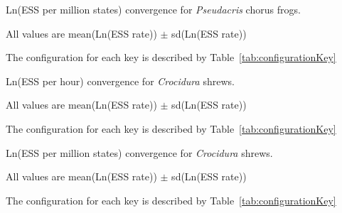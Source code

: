 \documentclass[12pt]{article}
\begin{document}
\begin{landscape}
\clearpage

\begin{table}[htb!]
\centering
\caption{Ln(ESS per million states) convergence for \textit{Pseudacris} chorus frogs.}
\label{tab:pseudacrisPerMstates}
\begin{threeparttable}
\begin{adjustbox}{center}
\renewcommand{\arraystretch}{1.5}
\tiny

\end{adjustbox}
\begin{tablenotes}
\tiny
\item All values are mean(Ln(ESS rate)) $\pm$ sd(Ln(ESS rate))
\item The configuration for each key is described by Table~\ref{tab:configurationKey}
\end{tablenotes}
\end{threeparttable}
\end{table}

\clearpage

\begin{table}[htb!]
\centering
\caption{Ln(ESS per hour) convergence for \textit{Crocidura} shrews.}
\label{tab:crociduraPerHour}
\begin{threeparttable}
\begin{adjustbox}{center}
\renewcommand{\arraystretch}{1.5}
\tiny

\end{adjustbox}
\begin{tablenotes}
\tiny
\item All values are mean(Ln(ESS rate)) $\pm$ sd(Ln(ESS rate))
\item The configuration for each key is described by Table~\ref{tab:configurationKey}
\end{tablenotes}
\end{threeparttable}
\end{table}

\begin{table}[htb!]
\centering
\caption{Ln(ESS per million states) convergence for \textit{Crocidura} shrews.}
\label{tab:crociduraPeMstates}
\begin{threeparttable}
\begin{adjustbox}{center}
\renewcommand{\arraystretch}{1.5}
\tiny

\end{adjustbox}
\begin{tablenotes}
\tiny
\item All values are mean(Ln(ESS rate)) $\pm$ sd(Ln(ESS rate))
\item The configuration for each key is described by Table~\ref{tab:configurationKey}
\end{tablenotes}
\end{threeparttable}
\end{table}

\clearpage

\end{landscape}
\end{document}
